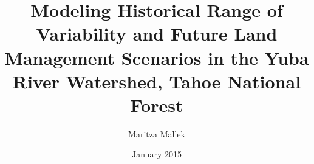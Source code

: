 \documentclass[12pt]{book}
\begin{document}
\author{Maritza Mallek}
\title{Modeling Historical Range of Variability and Future Land Management Scenarios in the Yuba River Watershed, Tahoe National Forest}
\date{January 2015}

%
%
% 
%
%
%
%
%
%

\maketitle
\frontmatter 
\tableofcontents 
% 

\mainmatter 

 
 
 

 
  

\backmatter 
% 
% 
\end{document}
